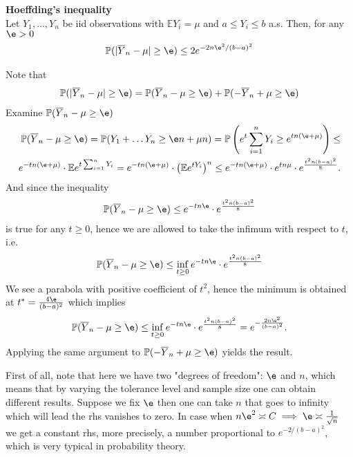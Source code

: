 \begin{thm}
\textbf{Hoeffding's inequality} \\
    Let $Y_1, \dots, Y_n$ be iid observations with $\mathbb{E}Y_i = \mu$ and $a \le Y_i \le b$ a.s. Then, for any $\e > 0$ 
    \begin{align}
        \mathbb{P}(|\overline{Y}_n - \mu| \ge \e) \le 2 e^{-2n\e^2/(b-a)^2}
    \end{align}
\end{thm}
\begin{s}
Note that 
\begin{align*}
    \mathbb{P}(|\overline{Y}_n - \mu| \ge \e) = \mathbb{P}(\overline{Y}_n - \mu \ge \e) + \mathbb{P}(-\overline{Y}_n + \mu \ge \e)
\end{align*}
Examine $\mathbb{P}(\overline{Y}_n - \mu \ge \e)$
\begin{align}
\mathbb{P}(\overline{Y}_n - \mu \ge \e) = \mathbb{P}(Y_1 + \dots Y_n \ge \e n + \mu n) = \mathbb{P}\left(e^{t}\sum_{i=1}^n Y_i \ge e^{tn(\e + \mu)}\right) \le \\ e^{-tn(\e + \mu)} \cdot \mathbb{E} e^{t\sum_{i=1}^n Y_i} = e^{-tn(\e + \mu)} \cdot \left(\mathbb{E} e^{tY_i}\right)^n \le e^{-tn(\e + \mu)} \cdot e^{tn\mu} \cdot e^{\frac{t^2 n (b-a)^2} 8}.
\end{align}
And since the inequality
\begin{align}
\mathbb{P}(\overline{Y}_n - \mu \ge \e) \le e^{-tn\e} \cdot e^{\frac{t^2 n (b-a)^2} 8}
\end{align}
is true for any $t \ge 0$, hence we are allowed to take the infimum with respect to $t$, i.e. 
\begin{align}\label{10}
\mathbb{P}(\overline{Y}_n - \mu \ge \e) \le \inf_{t \ge 0}e^{-tn\e} \cdot e^{\frac{t^2 n (b-a)^2} 8}
\end{align}
We see a parabola with positive coefficient of $t^2$, hence the minimum is obtained at $t^* = \frac{4\e}{{(b-a)^2}}$ which implies
\begin{align}
\mathbb{P}(\overline{Y}_n - \mu \ge \e) \le \inf_{t \ge 0}e^{-tn\e} \cdot e^{\frac{t^2 n (b-a)^2} 8} = e^{-\frac{2n\e^2}{(b-a)^2}}.
\end{align}
Applying the same argument to $\mathbb{P}(-\overline{Y}_n + \mu \ge \e)$ yields the result.
\end{s}
\begin{rmrk}
First of all, note that here we have two "degrees of freedom": $\e$ and $n$, which means that by varying the tolerance level and sample size one can obtain different results. Suppose we fix $\e$ then one can take $n$ that goes to infinity which will lead the rhs vanishes to zero. In case when $n\e^2 \asymp C \implies \e \asymp \frac 1 {\sqrt{n}}$ we get a constant rhs, more precisely, a number proportional to $e^{-2/{(b-a)^2}}$, which is very typical in probability theory.
\end{rmrk}
